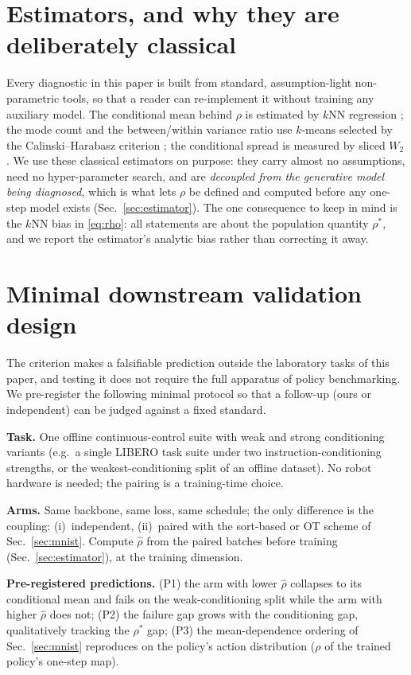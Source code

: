 \documentclass{article}
\theoremstyle{plain}
\begin{document}
\section{Estimators, and why they are deliberately classical}
\label{app:estimators}
Every diagnostic in this paper is built from standard, assumption-light
non-parametric tools, so that a reader can re-implement it without training any
auxiliary model. The conditional mean behind $\rho$ is estimated by $k$NN regression
\citep{cover1967nn}; the mode count and the between/within variance ratio use $k$-means
\citep{lloyd1982,macqueen1967} selected by the Calinski--Harabasz criterion
\citep{calinski1974}; the conditional spread is measured by sliced $W_2$
\citep{kolouri2019gsw}. We use these classical estimators on purpose: they carry almost
no assumptions, need no hyper-parameter search, and are \emph{decoupled from the
generative model being diagnosed}, which is what lets $\rho$ be defined and computed
before any one-step model exists (Sec.~\ref{sec:estimator}). The one consequence to
keep in mind is the $k$NN bias in \eqref{eq:rho}: all statements are about the
population quantity $\rho^\ast$, and we report the estimator's analytic bias rather
than correcting it away.

\section{Minimal downstream validation design}
\label{app:downstream}
The criterion makes a falsifiable prediction outside the laboratory tasks of this
paper, and testing it does not require the full apparatus of policy benchmarking. We
pre-register the following minimal protocol so that a follow-up (ours or independent)
can be judged against a fixed standard.

\textbf{Task.} One offline continuous-control suite with weak and strong conditioning
variants (e.g.\ a single LIBERO task suite under two instruction-conditioning strengths,
or the weakest-conditioning split of an offline dataset). No robot hardware is needed;
the pairing is a training-time choice.

\textbf{Arms.} Same backbone, same loss, same schedule; the only difference is the
coupling: (i)~independent, (ii)~paired with the sort-based or OT scheme of
Sec.~\ref{sec:mnist}. Compute $\hat\rho$ from the paired batches before training
(Sec.~\ref{sec:estimator}), at the training dimension.

\textbf{Pre-registered predictions.} (P1) the arm with lower $\hat\rho$ collapses to
its conditional mean and fails on the weak-conditioning split while the arm with
higher $\hat\rho$ does not; (P2) the failure gap grows with the conditioning gap,
qualitatively tracking the $\rho^\ast$ gap; (P3) the mean-dependence ordering of
Sec.~\ref{sec:mnist} reproduces on the policy's action distribution
($\rho$ of the trained policy's one-step map).
\end{document}
